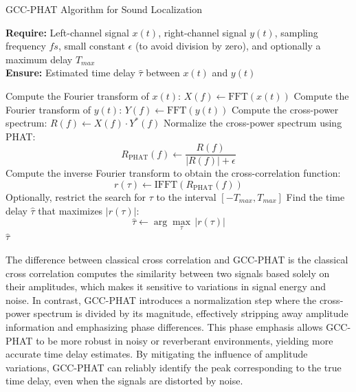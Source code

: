 \documentclass{CSSRforAfrica}
\begin{document}
\begin{algorithm}
	\caption{GCC-PHAT Algorithm for Sound Localization}
	\textbf{Require:} Left-channel signal \(x(t)\), right-channel signal \(y(t)\), sampling frequency \(fs\), small constant \(\epsilon\) (to avoid division by zero), and optionally a maximum delay \(T_{max}\)\\
	\textbf{Ensure:} Estimated time delay \(\hat{\tau}\) between \(x(t)\) and \(y(t)\)
	\begin{algorithmic}[1]
		\State Compute the Fourier transform of \(x(t)\): \(X(f) \gets \text{FFT}(x(t))\)
		\State Compute the Fourier transform of \(y(t)\): \(Y(f) \gets \text{FFT}(y(t))\)
		\State Compute the cross-power spectrum: \(R(f) \gets X(f) \cdot Y^*(f)\) 
		\State Normalize the cross-power spectrum using PHAT:
		\[
		R_{\text{PHAT}}(f) \gets \frac{R(f)}{|R(f)| + \epsilon}
		\]
		\State Compute the inverse Fourier transform to obtain the cross-correlation function:
		\[
		r(\tau) \gets \text{IFFT}(R_{\text{PHAT}}(f))
		\]
		\State Optionally, restrict the search for \(\tau\) to the interval \([-T_{max}, T_{max}]\)
		\State Find the time delay \(\hat{\tau}\) that maximizes \(|r(\tau)|\):
		\[
		\hat{\tau} \gets \arg\max_{\tau} \, |r(\tau)|
		\]
		\State \Return \(\hat{\tau}\)
	\end{algorithmic}
\end{algorithm}

The difference between classical cross correlation and GCC-PHAT is the classical cross correlation computes the similarity between two signals based solely on their amplitudes, which makes it sensitive to variations in signal energy and noise. In contrast, GCC-PHAT introduces a normalization step where the cross-power spectrum is divided by its magnitude, effectively stripping away amplitude information and emphasizing phase differences. This phase emphasis allows GCC-PHAT to be more robust in noisy or reverberant environments, yielding more accurate time delay estimates. By mitigating the influence of amplitude variations, GCC-PHAT can reliably identify the peak corresponding to the true time delay, even when the signals are distorted by noise.
\end{document}
